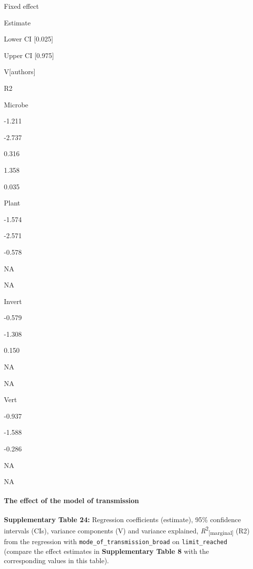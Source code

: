 \documentclass[
]{article}
\begin{document}
Fixed effect

Estimate

Lower CI {[}0.025{]}

Upper CI {[}0.975{]}

V{[}authors{]}

R2

Microbe

-1.211

-2.737

0.316

1.358

0.035

Plant

-1.574

-2.571

-0.578

NA

NA

Invert

-0.579

-1.308

0.150

NA

NA

Vert

-0.937

-1.588

-0.286

NA

NA

\hypertarget{the-effect-of-the-model-of-transmission-1}{%
\paragraph{The effect of the model of
transmission}\label{the-effect-of-the-model-of-transmission-1}}

\textbf{Supplementary Table 24:} Regression coefficients (estimate),
95\% confidence intervals (CIs), variance components (V) and variance
explained, \emph{R}\textsuperscript{2}\textsubscript{{[}marginal{]}}
(R2) from the regression with \texttt{mode\_of\_transmission\_broad} on
\texttt{limit\_reached} (compare the effect estimates in
\textbf{Supplementary Table 8} with the corresponding values in this
table).
\end{document}
